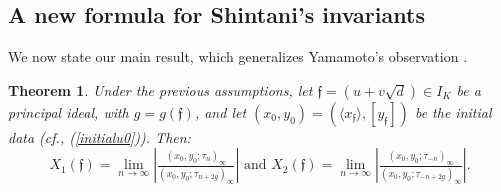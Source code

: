 \documentclass[11pt, a4paper]{amsart}
\newcommand{\eq}[1]{\begin{equation}#1\end{equation}}
\theoremstyle{plain}
\newtheorem{theorem}{Theorem}[section]
\numberwithin{equation}{section}
\begin{document}
\subsection{A new formula for Shintani's invariants}
We now state our main result, which generalizes Yamamoto’s observation \cite{yamamoto2010factorization}.
\begin{theorem}
\label{maintheorem}
Under the previous assumptions, let $\mathfrak f = (u+v\sqrt{d}) \in I_K$ be a principal ideal, with $g = g(\mathfrak f)$, and let  $(x_0,y_0) = (\langle x_{\mathfrak f}\rangle,[y_{\mathfrak f}])$ be the initial data (cf., (\ref{initialu0})). Then: \eq{\label{expression0}X_1(\mathfrak f) = \lim_{n\to \infty}\left\vert \tfrac{(x_0,y_0;\tau_{n})_\infty}{(x_0,y_0;\tau_{n+2g})_\infty} \right\vert \text{ and } X_2(\mathfrak f) = \lim_{n\to \infty}\left\vert \tfrac{(x_0,y_0;\tau_{-n})_\infty}{(x_0,y_0;\tau_{-n+2g})_\infty} \right\vert.}
\end{theorem}
\end{document}
